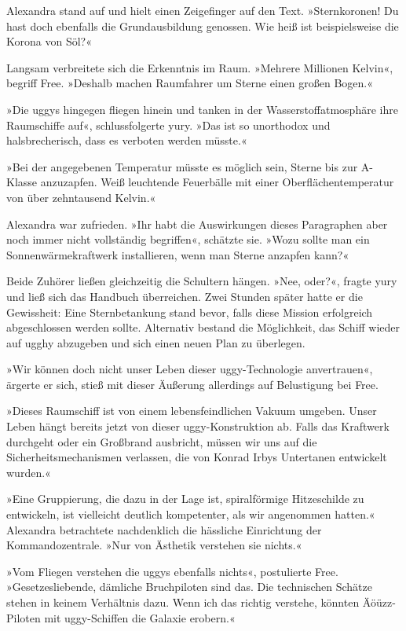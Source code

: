Alexandra stand auf und hielt einen Zeigefinger auf den Text. »Sternkoronen! Du hast doch ebenfalls die Grundausbildung genossen. Wie heiß ist beispielsweise die Korona von Söl?«

Langsam verbreitete sich die Erkenntnis im Raum. »Mehrere Millionen Kelvin«, begriff Free. »Deshalb machen Raumfahrer um Sterne einen großen Bogen.«

»Die uggys hingegen fliegen hinein und tanken in der Wasserstoffatmosphäre ihre Raumschiffe auf«, schlussfolgerte yury. »Das ist so unorthodox und halsbrecherisch, dass es verboten werden müsste.«

»Bei der angegebenen Temperatur müsste es möglich sein, Sterne bis zur A-Klasse anzuzapfen. Weiß leuchtende Feuerbälle mit einer Oberflächentemperatur von über zehntausend Kelvin.«

Alexandra war zufrieden. »Ihr habt die Auswirkungen dieses Paragraphen aber noch immer nicht vollständig begriffen«, schätzte sie. »Wozu sollte man ein Sonnenwärmekraftwerk installieren, wenn man Sterne anzapfen kann?«

Beide Zuhörer ließen gleichzeitig die Schultern hängen. »Nee, oder?«, fragte yury und ließ sich das Handbuch überreichen. Zwei Stunden später hatte er die Gewissheit: Eine Sternbetankung stand bevor, falls diese Mission erfolgreich abgeschlossen werden sollte. Alternativ bestand die Möglichkeit, das Schiff wieder auf ugghy abzugeben und sich einen neuen Plan zu überlegen.

»Wir können doch nicht unser Leben dieser uggy-Technologie anvertrauen«, ärgerte er sich, stieß mit dieser Äußerung allerdings auf Belustigung bei Free.

»Dieses Raumschiff ist von einem lebensfeindlichen Vakuum umgeben. Unser Leben hängt bereits jetzt von dieser uggy-Konstruktion ab. Falls das Kraftwerk durchgeht oder ein Großbrand ausbricht, müssen wir uns auf die Sicherheitsmechanismen verlassen, die von Konrad Irbys Untertanen entwickelt wurden.«

»Eine Gruppierung, die dazu in der Lage ist, spiralförmige Hitzeschilde zu entwickeln, ist vielleicht deutlich kompetenter, als wir angenommen hatten.« Alexandra betrachtete nachdenklich die hässliche Einrichtung der Kommandozentrale. »Nur von Ästhetik verstehen sie nichts.«

»Vom Fliegen verstehen die uggys ebenfalls nichts«, postulierte Free. »Gesetzesliebende, dämliche Bruchpiloten sind das. Die technischen Schätze stehen in keinem Verhältnis dazu. Wenn ich das richtig verstehe, könnten Äöüzz-Piloten mit uggy-Schiffen die Galaxie erobern.«

